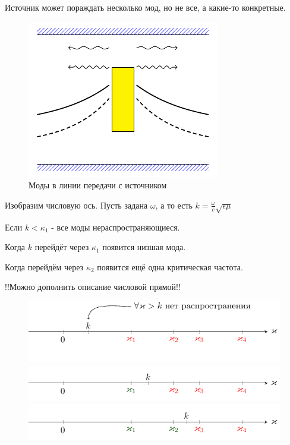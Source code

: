 Источник может пораждать несколько мод, но не все, а какие-то конкретные.
\begin{figure}[H]
	\centering
	\includegraphics[scale=1.5]{img/lect3_ris4}
	\caption{Моды в линии передачи с источником}
	\label{fig:lect3:4}
\end{figure}
Изобразим числовую ось.
Пусть задана $\omega$, а то есть $k = \frac{\omega}{c} \sqrt{\epsilon \mu}$

Если $k < \kappa_1$ - все моды нераспространяющиеся.

Когда $k$ перейдёт через $\kappa_1$ появится низшая мода.

Когда перейдём через $\kappa_2$  появится ещё одна критическая частота.

!!Можно дополнить описание числовой прямой!!
\begin{figure}[H]
	\centering
	\includegraphics[scale=1.5]{img/lect3_ris5}
	\includegraphics[scale=1.5]{img/lect3_ris6}
	\includegraphics[scale=1.5]{img/lect3_ris7}
\end{figure}

